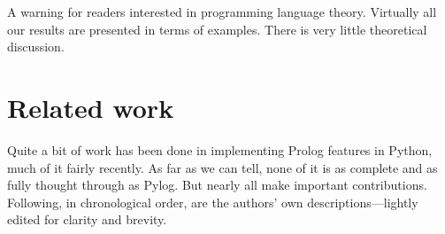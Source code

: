 A warning for readers interested in programming language theory. Virtually all our results are presented in terms of examples. There is very little theoretical discussion.

\section{Related work}\label{sec:related_work}

Quite a bit of work has been done in implementing Prolog features in Python, much of it fairly recently. As far as we can tell, none of it is as complete and as fully thought through as Pylog. But nearly all make important contributions. Following, in chronological order, are the authors' own descriptions---lightly edited for clarity and brevity.

